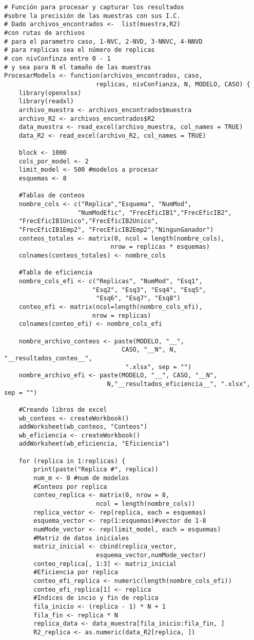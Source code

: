 \begin{verbatim}
# Función para procesar y capturar los resultados 
#sobre la precisión de las muestras con sus I.C.
# Dado archivos_encontrados <-  list(muestra,R2) 
#con rutas de archivos
# para el parametro caso, 1-NVC, 2-NVD, 3-NNVC, 4-NNVD
# para replicas sea el número de replicas
# con nivConfinza entre 0 - 1
# y sea para N el tamaño de las muestras
ProcesarModels <- function(archivos_encontrados, caso,
						 replicas, nivConfianza, N, MODELO, CASO) {
	library(openxlsx)
	library(readxl)
	archivo_muestra <- archivos_encontrados$muestra
	archivo_R2 <- archivos_encontrados$R2
	data_muestra <- read_excel(archivo_muestra, col_names = TRUE)
	data_R2 <- read_excel(archivo_R2, col_names = TRUE)
	
	block <- 1000
	cols_por_model <- 2
	limit_model <- 500 #modelos a procesar
	esquemas <- 8
	
	#Tablas de conteos
	nombre_cols <- c("Replica","Esquema", "NumMod", 
					"NumModEfic", "FrecEficIB1","FrecEficIB2",
	"FrecEficIB1Unico","FrecEficIB2Unico",
	"FrecEficIB1Emp2", "FrecEficIB2Emp2","NingunGanador")
	conteos_totales <- matrix(0, ncol = length(nombre_cols),
							 nrow = replicas * esquemas)
	colnames(conteos_totales) <- nombre_cols
	
	#Tabla de eficiencia
	nombre_cols_efi <- c("Replicas", "NumMod", "Esq1", 
						"Esq2", "Esq3", "Esq4", "Esq5",
						 "Esq6", "Esq7", "Esq8")
	conteo_efi <- matrix(ncol=length(nombre_cols_efi),
						nrow = replicas)
	colnames(conteo_efi) <- nombre_cols_efi
	
	nombre_archivo_conteos <- paste(MODELO, "__", 
								CASO, "__N", N, "__resultados_conteo__",
								 ".xlsx", sep = "")
	nombre_archivo_efi <- paste(MODELO, "__", CASO, "__N", 
							N,"__resultados_eficiencia__", ".xlsx", sep = "")
	
	#Creando libros de excel
	wb_conteos <- createWorkbook()
	addWorksheet(wb_conteos, "Conteos")
	wb_eficiencia <- createWorkbook()
	addWorksheet(wb_eficiencia, "Eficiencia")
	
	for (replica in 1:replicas) {
		print(paste("Replica #", replica))
		num_m <- 0 #num de modelos
		#Conteos por replica
		conteo_replica <- matrix(0, nrow = 8,
						 ncol = length(nombre_cols))
		replica_vector <- rep(replica, each = esquemas)
		esquema_vector <- rep(1:esquemas)#vector de 1-8
		numMode_vector <- rep(limit_model, each = esquemas)
		#Matriz de datos iniciales
		matriz_inicial <- cbind(replica_vector,
						 esquema_vector,numMode_vector)
		conteo_replica[, 1:3] <- matriz_inicial
		#Eficiencia por replica
		conteo_efi_replica <- numeric(length(nombre_cols_efi))
		conteo_efi_replica[1] <- replica
		#Indices de incio y fin de replica
		fila_inicio <- (replica - 1) * N + 1
		fila_fin <- replica * N
		replica_data <- data_muestra[fila_inicio:fila_fin, ]
		R2_replica <- as.numeric(data_R2[replica, ])
		

\end{verbatim}
